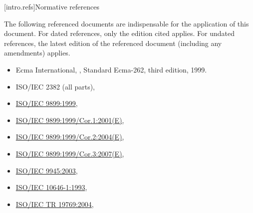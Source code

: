 [intro.refs]{Normative references}

\pnum
{}%
The following referenced documents are indispensable for the application
of this document. For dated references, only the edition cited applies.
For undated references, the latest edition of the referenced document
(including any amendments) applies.

\begin{itemize}
\item Ecma International, ,
Standard Ecma-262, third edition, 1999.
\item ISO/IEC 2382 (all parts), 
\item \href{http://www.iso.org/iso/home/store/catalogue_ics/catalogue_detail_ics.htm?csnumber=29237}{ISO/IEC 9899:1999}, 
\item \href{http://www.iso.org/iso/home/store/catalogue_ics/catalogue_detail_ics.htm?csnumber=35952}{ISO/IEC 9899:1999/Cor.1:2001(E)}, 
\item \href{http://www.iso.org/iso/home/store/catalogue_ics/catalogue_detail_ics.htm?csnumber=41326}{ISO/IEC 9899:1999/Cor.2:2004(E)}, 
\item \href{http://www.iso.org/iso/home/store/catalogue_ics/catalogue_detail_ics.htm?csnumber=50510}{ISO/IEC 9899:1999/Cor.3:2007(E)}, 
\item \href{http://www.iso.org/iso/iso_catalogue/catalogue_ics/catalogue_detail_ics.htm?csnumber=38790}{ISO/IEC 9945:2003}, 
\item \href{http://www.iso.org/iso/catalogue_detail.htm?csnumber=18741}{ISO/IEC 10646-1:1993}, 
\item \href{http://www.iso.org/iso/iso_catalogue/catalogue_tc/catalogue_detail.htm?csnumber=33907}{ISO/IEC TR 19769:2004}, 
\end{itemize}

